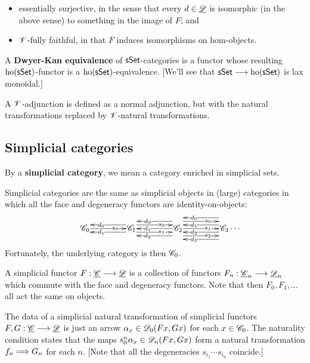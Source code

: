 \documentclass[11pt]{article}
\begin{document}
\begin{4. Basic concepts in enriched category theory}
\begin{itemise}
\begin{itemize}
\setlength{\parindent}{.25in}
\item essentially surjective, in the sense that every $d\in\underline{\mathscr{D}}$ is isomorphic (in the above sense) to something in the image of $F$; and
\item $\mathscr{V}$-fully faithful, in that $F$ induces isomorphisms on hom-objects.
\end{itemize}
A \textbf{Dwyer-Kan equivalence} of $\operatorname{{\mathsf{sSet}}}$-categories is a functor whose resulting $\textup{ho}(\operatorname{{\mathsf{sSet}}})$-functor is a $\textup{ho}(\operatorname{{\mathsf{sSet}}})$-equivalence. [We'll see that $\operatorname{{\mathsf{sSet}}}\longrightarrow\textup{ho}(\operatorname{{\mathsf{sSet}}})$ is lax monoidal.]
\item A $\mathscr{V}$-adjunction is defined as a normal adjunction, but with the natural transformations replaced by $\mathscr{V}$-natural transformations.
\end{itemise}
\subsection*{Simplicial categories}
\begin{itemise}
\setlength{\parindent}{.25in}
\item By a \textbf{simplicial category}, we mean a category enriched in simplicial sets.
\item Simplicial categories are the same as simplicial objects in (large) categories in which all the face and degeneracy functors are identity-on-objects:
\[\vcenter{
\def\labelstyle{\scriptstyle}
\xymatrix@C=1.5cm@1{
\scrC_0
\ar[r]|(.65){s_0}
&
\scrC_1
\ar@<-1ex>[l]|(.65){d_0}
\ar@<+1ex>[l]|(.65){d_1}
\ar@<+1ex>[r]|(.65){s_0}
\ar@<-1ex>[r]|(.65){s_1}
&
\scrC_2
\ar[l]|(.65){d_1}
\ar@<-2ex>[l]|(.65){d_0}
\ar@<+2ex>[l]|(.65){d_2}
\ar[r]|(.65){s_1}
\ar@<+2ex>[r]|(.65){s_0}
\ar@<-2ex>[r]|(.65){s_2}
&
\scrC_3\makebox[0cm][l]{\,$\cdots $}
\ar@<-3ex>[l]|(.65){d_0}
\ar@<-1ex>[l]|(.65){d_1}
\ar@<+1ex>[l]|(.65){d_2}
\ar@<+3ex>[l]|(.65){d_3}
}}\]
Fortunately, the underlying category is then $\mathscr{C}_0$.
\item A simplicial functor $F:\underline{\mathscr{C}}\longrightarrow\underline{\mathscr{D}}$ is a collection of functors $F_n:\underline{\mathscr{C}}_n\longrightarrow\underline{\mathscr{D}}_n$ which commute with the face and degeneracy functors. Note that then $F_0,F_1,\ldots$ all act the same on objects.
\item The data of a simplicial natural transformation of simplicial functors $F,G:\underline{\mathscr{C}}\longrightarrow\underline{\mathscr{D}}$ is just an arrow $\alpha_x\in\mathscr{D}_0(Fx,Gx)$ for each $x\in\mathscr{C}_0$.
The naturality condition states that the maps $s_0^n\alpha_x\in\mathscr{D}_n(Fx,Gx)$ form a natural transformation $f_n\Longrightarrow G_n$ for each $n$. [Note that all the degeneracies $s_{i_1}\cdots s_{i_n}$ coincide.]
\end{itemise}

\end{4. Basic concepts in enriched category theory}
\end{document}
